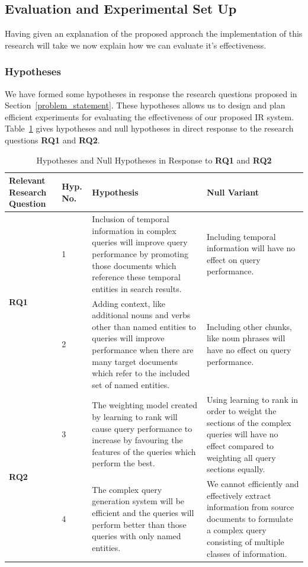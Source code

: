 \documentclass{mprop}
\begin{document}
\subsection{Evaluation and Experimental Set Up}\label{proposed_approach.evaluation}
Having given an explanation of the proposed approach the implementation of this research will take we now explain how we can evaluate it's effectiveness.

\subsubsection{Hypotheses}
We have formed some hypotheses in response the research questions proposed in Section~\ref{problem_statement}. 
These hypotheses allows us to design and plan efficient experiments for evaluating the effectiveness of our proposed IR system.
Table~\ref{hypotheses.table} gives hypotheses and null hypotheses in direct response to the research questions \textbf{RQ1} and \textbf{RQ2}.

\begin{table}[H]
\centering
\begin{tabular}{|p{2cm}|p{1cm}|p{6cm}|p{6cm}|}
\hline
Relevant Research Question  & Hyp. No.  & Hypothesis & Null Variant     \\ \hline
\multirow{2}{*}{\textbf{RQ1}} & 1 & Inclusion of temporal information in complex queries will improve query performance by promoting those documents which reference these temporal entities in search results. & Including temporal information will have no effect on query performance.\\ \cline{2-4}
& 2 & Adding context, like additional nouns and verbs other than named entities to queries will improve performance when there are many target documents which refer to the included set of named entities. & Including other chunks, like noun phrases will have no effect on query performance. \\ \cline{1-4}
\multirow{2}{*}{\textbf{RQ2}} & 3 & The weighting model created by learning to rank will cause query performance to increase by favouring the features of the queries which perform the best. & Using learning to rank in order to weight the sections of the complex queries will have no effect compared to weighting all query sections equally. \\ \cline{2-4}
& 4 & The complex query generation system will be efficient and the queries will perform better than those queries with only named entities. & We cannot efficiently and effectively extract information from source documents to formulate a complex query consisting of multiple classes of information. \\ \cline{1-4}
\end{tabular}
\caption{Hypotheses and Null Hypotheses in Response to \textbf{RQ1} and \textbf{RQ2}}
\label{hypotheses.table}
\end{table}
\end{document}
